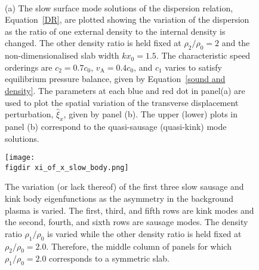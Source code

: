 \documentclass[12pt,draft]{../style-files/ociamthesis}
\begin{document}
\begin{figure} []
	\centering
	 \\
	
	\caption{(a) The slow surface mode solutions of the dispersion relation, Equation~\eqref{DR}, are plotted showing the variation of the dispersion as the ratio of one external density to the internal density is changed. The other density ratio is held fixed at $\rho_2/\rho_0=2$ and the non-dimensionalised slab width $kx_0 = 1.5$. The characteristic speed orderings are $c_2=0.7c_0$, $v_\textrm{A}=0.4c_0$, and $c_1$ varies to satisfy equilibrium pressure balance, given by Equation~\eqref{sound and density}. The parameters at each blue and red dot in panel(a) are used to plot the spatial variation of the transverse displacement perturbation, $\widehat{\xi}_x$, given by panel (b). The upper (lower) plots in panel (b) correspond to the quasi-sausage (quasi-kink) mode solutions.}
	\label{fig: avoided crossing}
\end{figure}

\begin{figure}
	\centering
	\texttt{[image: \\figdir xi\_of\_x\_slow\_body.png]}
	\caption{The variation (or lack thereof) of the first three slow sausage and kink body eigenfunctions as the asymmetry in the background plasma is varied. The first, third, and fifth rows are kink modes and the second, fourth, and sixth rows are sausage modes. The density ratio $\rho_1/\rho_0$ is varied while the other density ratio is held fixed at $\rho_2/\rho_0 = 2.0$. Therefore, the middle column of panels for which $\rho_1/\rho_0 = 2.0$ corresponds to a symmetric slab.}
	\label{fig: body eigenmodes}
\end{figure}
\end{document}
